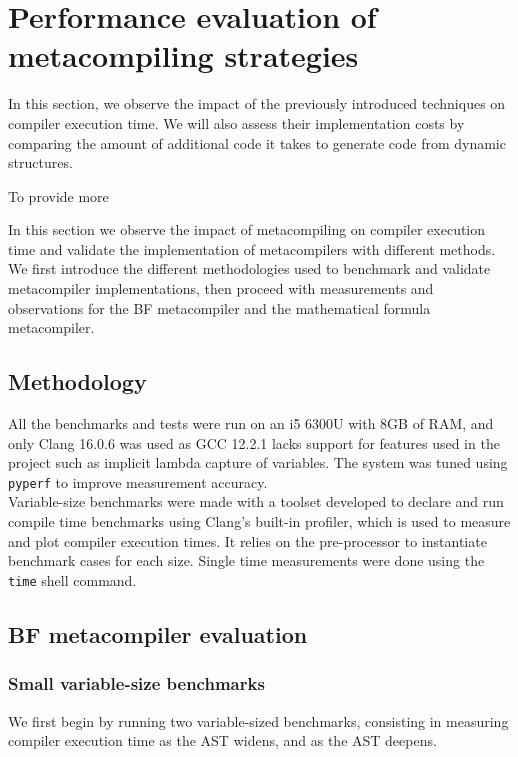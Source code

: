\documentclass[../../../main]{subfiles}
\begin{document}
\section{Performance evaluation of metacompiling strategies}
\label{lbl:compile-time-eval}

In this section, we observe the impact of the previously introduced techniques
on compiler execution time. We will also assess their implementation costs
by comparing the amount of additional code it takes to generate code from
\constexpr dynamic structures.

To provide more

In this section we observe the impact of metacompiling on compiler execution
time and validate the implementation of metacompilers with different methods.
We first introduce the different methodologies used to benchmark and validate
metacompiler implementations, then proceed with measurements and observations
for the BF metacompiler and the mathematical formula metacompiler.

\subsection{Methodology}

All the benchmarks and tests were run on an i5 6300U with 8GB of RAM, and only
Clang 16.0.6 was used as GCC 12.2.1 lacks support for features used in the
project such as implicit lambda capture of \constexpr variables. The system was
tuned using \lstinline{pyperf} to improve measurement accuracy.
\\

Variable-size benchmarks were made with a toolset developed to declare and run
compile time benchmarks using Clang's built-in profiler, which is used to
measure and plot compiler execution times. It relies on the \cpp pre-processor
to instantiate benchmark cases for each size.
Single time measurements were done using the \lstinline{time} shell command.

\subsection{BF metacompiler evaluation}

\subsubsection{Small variable-size benchmarks}

We first begin by running two variable-sized benchmarks, consisting in
measuring compiler execution time as the AST widens, and as the AST deepens.\\
\end{document}

